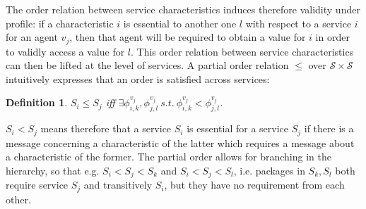 \documentclass[compsoc, conference, letterpaper, 10pt, times]{IEEEtran}
\newtheorem{definition}{Definition}
\begin{document}
The order relation between service characteristics induces therefore validity under profile: if a characteristic $i$ is essential to another one $l$ with respect to a service $i$ for an agent $v_{j}$, then that agent will be required to obtain a value for  $i$ in order to validly access a value for $l$. This order relation between service characteristics can then be lifted at the level of services. A partial order relation $\leq$ over $\mathcal{S}\times \mathcal{S}$ intuitively expresses that an order is satisfied across services: 

\begin{definition}\label{def:orderrepos}
	$S_{i}\leq S_{j}$  iff $\exists \phi^{v_{j}}_{i,k},\phi^{v_{j}}_{j,l}\ s.t.\ \phi^{v_{j}}_{i,k}<\phi^{v_{j}}_{j,l}$.
\end{definition}
$S_{i}< S_{j}$ means therefore that a service $S_{i}$ is essential for a service $S_{j}$ if there is a message concerning a characteristic of the latter which requires a message about a characteristic of the former. 
The partial order allows for branching in the hierarchy, so that e.g. $S_{i}<S_{j}<S_{k}$ and $S_{i}<S_{j}<S_{l}$,  i.e. packages in $S_{k},S_{l}$  both require service $S_{j}$ and transitively $S_{i}$, but they have no requirement from each other. 
\end{document}
